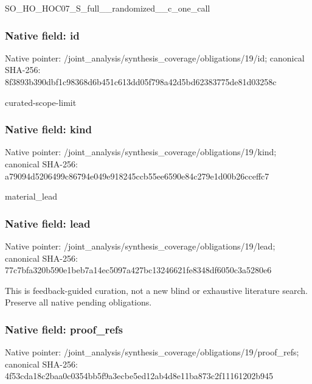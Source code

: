 \documentclass[10pt,a4paper]{article}
\begin{document}
\begingroup\raggedright\sloppy SO\_\allowbreak{}HO\_\allowbreak{}HOC07\_\allowbreak{}S\_\allowbreak{}full\_\allowbreak{}\_\allowbreak{}randomized\_\allowbreak{}\_\allowbreak{}c\_\allowbreak{}one\_\allowbreak{}call\par\endgroup

\subsubsection{Native field: id}
Native pointer: /joint\_\allowbreak{}analysis/synthesis\_\allowbreak{}coverage/obligations/19/id; canonical SHA-256: 8f3893b390dbf1c98368d6b451c613dd05f798a42d5bd62383775de81d03258c

\begingroup\raggedright\sloppy curated-scope-limit\par\endgroup

\subsubsection{Native field: kind}
Native pointer: /joint\_\allowbreak{}analysis/synthesis\_\allowbreak{}coverage/obligations/19/kind; canonical SHA-256: a79094d5206499c86794e049e918245ccb55ee6590e84c279e1d00b26cceffc7

\begingroup\raggedright\sloppy material\_\allowbreak{}lead\par\endgroup

\subsubsection{Native field: lead}
Native pointer: /joint\_\allowbreak{}analysis/synthesis\_\allowbreak{}coverage/obligations/19/lead; canonical SHA-256: 77c7bfa320b590e1beb7a14ec5097a427bc13246621fe8348df6050c3a5280e6

\begingroup\raggedright\sloppy This is feedback-guided curation,\allowbreak{} not a new blind or exhaustive literature search. Preserve all native pending obligations.\par\endgroup

\subsubsection{Native field: proof\_\allowbreak{}refs}
Native pointer: /joint\_\allowbreak{}analysis/synthesis\_\allowbreak{}coverage/obligations/19/proof\_\allowbreak{}refs; canonical SHA-256: 4f53cda18c2baa0c0354bb5f9a3ecbe5ed12ab4d8e11ba873c2f11161202b945
\end{document}
